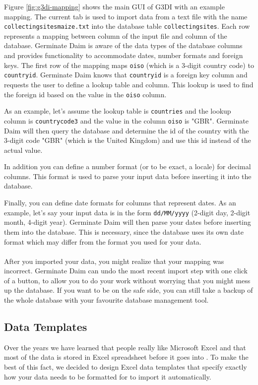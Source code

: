 \noindent Figure \ref{fig:g3di-mapping} shows the main GUI of G3DI with an example mapping. The current tab is used to import data from a text file with the name \texttt{collectingsites\textunderscore maize.txt} into the database table \texttt{collectingsites}. Each row represents a mapping between column of the input file and column of the database. Germinate Daim is aware of the data types of the database columns and provides functionality to accommodate dates, number formats and foreign keys. The first row of the mapping maps \texttt{oiso} (which is a 3-digit country code) to \texttt{country\textunderscore id}. Germinate Daim knows that \texttt{country\textunderscore id} is a foreign key column and requests the user to define a lookup table and column. This lookup is used to find the foreign id based on the value in the \texttt{oiso} column.

As an example, let's assume the lookup table is \texttt{countries} and the lookup column is \texttt{country\textunderscore code3} and the value in the column \texttt{oiso} is "GBR". Germinate Daim will then query the database and determine the id of the country with the 3-digit code "GBR" (which is the United Kingdom) and use this id instead of the actual value.

In addition you can define a number format (or to be exact, a locale) for decimal columns. This format is used to parse your input data before inserting it into the database.

Finally, you can define date formats for columns that represent dates. As an example, let's say your input data is in the form \texttt{dd/MM/yyyy} (2-digit day, 2-digit month, 4-digit year). Germinate Daim will then parse your dates before inserting them into the database. This is necessary, since the database uses its own date format which may differ from the format you used for your data.\\
\\
After you imported your data, you might realize that your mapping was incorrect. Germinate Daim can undo the most recent import step with one click of a button, to allow you to do your work without worrying that you might mess up the database. If you want to be on the safe side, you can still take a backup of the whole database with your favourite database management tool.

\subsection{{\germinate} Data Templates}
Over the years we have learned that people really like Microsoft Excel and that most of the data is stored in Excel spreadsheet before it goes into {\germinate}. To make the best of this fact, we decided to design Excel data templates that specify exactly how your data needs to be formatted for {\germinate} to import it automatically.

